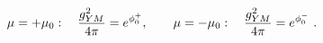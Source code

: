 \begin{equation}
\mu=+\mu_0: \quad {g_{YM}^2\over 4 \pi}= e^{ \phi_0^+}, \quad \quad
\mu=-\mu_0: \quad {g_{YM}^2\over 4 \pi}= e^{ \phi_0^-}\ . 
\end{equation} 
